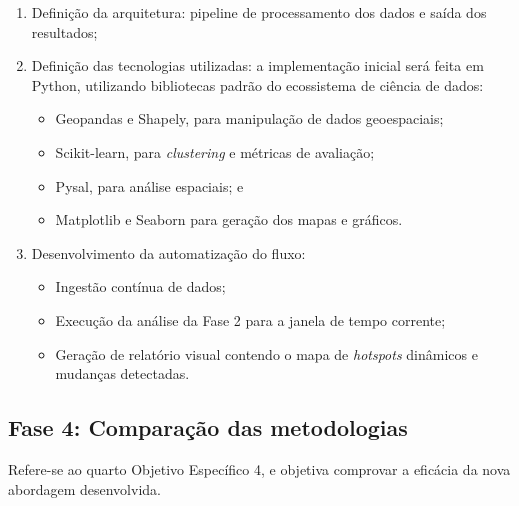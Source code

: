 \begin{enumerate}
  \item{Definição da arquitetura: pipeline de processamento dos dados e saída dos resultados;}
  \item{Definição das tecnologias utilizadas: a implementação inicial será feita em Python, utilizando bibliotecas padrão do ecossistema de ciência de dados:}
  \begin{itemize}
    \item{Geopandas e Shapely, para manipulação de dados geoespaciais;}
    \item{Scikit-learn, para \textit{clustering} e métricas de avaliação;}
    \item{Pysal, para análise espaciais; e}
    \item{Matplotlib e Seaborn para geração dos mapas e gráficos.}
  \end{itemize}
  \item{Desenvolvimento da automatização do fluxo:}
  \begin{itemize}
    \item{Ingestão contínua de dados;}
    \item{Execução da análise da Fase 2 para a janela de tempo corrente;}
    \item{Geração de relatório visual contendo o mapa de \textit{hotspots} dinâmicos e mudanças detectadas.}
  \end{itemize}
\end{enumerate}

\subsection{Fase 4: Comparação das metodologias}

Refere-se ao quarto Objetivo Específico 4, e objetiva comprovar a eficácia da nova abordagem desenvolvida.

